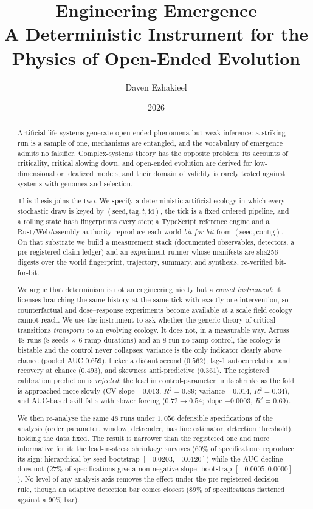 \documentclass[11pt,a4paper]{article}
\title{\textbf{Engineering Emergence}\\[2mm]
\large A Deterministic Instrument for the Physics of Open-Ended Evolution}
\author{Daven Ezhakieel}
\date{2026}
\begin{document}
\maketitle

\begin{abstract}
\noindent
Artificial-life systems generate open-ended phenomena but weak inference: a
striking run is a sample of one, mechanisms are entangled, and the vocabulary of
emergence admits no falsifier. Complex-systems theory has the opposite problem:
its accounts of criticality, critical slowing down, and open-ended evolution are
derived for low-dimensional or idealized models, and their domain of validity is
rarely tested against systems with genomes and selection.

This thesis joins the two. We specify a deterministic artificial ecology in
which every stochastic draw is keyed by $(\text{seed}, \text{tag}, t, \text{id})$,
the tick is a fixed ordered pipeline, and a rolling state hash fingerprints every
step; a TypeScript reference engine and a Rust/WebAssembly authority reproduce
each world \emph{bit-for-bit} from $(\text{seed}, \text{config})$. On that
substrate we build a measurement stack (documented observables, detectors, a
pre-registered claim ledger) and an experiment runner whose manifests are sha256
digests over the world fingerprint, trajectory, summary, and synthesis,
re-verified bit-for-bit.

We argue that determinism is not an engineering nicety but a \emph{causal
instrument}: it licenses branching the same history at the same tick with
exactly one intervention, so counterfactual and dose--response experiments
become available at a scale field ecology cannot reach. We use the instrument to
ask whether the generic theory of critical transitions \emph{transports} to an
evolving ecology. It does not, in a measurable way. Across 48 runs (8 seeds
$\times$ 6 ramp durations) and an 8-run no-ramp control, the ecology is
bistable and the control never collapses; variance is the only indicator
clearly above chance (pooled AUC $0.659$), flicker a distant second ($0.562$),
lag-1 autocorrelation and recovery at chance ($0.493$), and skewness
anti-predictive ($0.361$). The registered calibration prediction is
\emph{rejected}: the lead in control-parameter units shrinks as the fold is
approached more slowly (CV slope $-0.013$, $R^2 = 0.89$; variance $-0.014$,
$R^2 = 0.34$), and AUC-based skill falls with slower forcing
($0.72 \to 0.54$; slope $-0.0003$, $R^2 = 0.69$).

We then re-analyse the same 48 runs under $1{,}056$ defensible specifications of
the analysis (order parameter, window, detrender, baseline estimator, detection
threshold), holding the data fixed. The result is narrower than the registered
one and more informative for it: the lead-in-stress shrinkage survives (60\% of
specifications reproduce its sign; hierarchical-by-seed bootstrap
$[-0.0203, -0.0120]$) while the AUC decline does not (27\% of specifications
give a non-negative slope; bootstrap $[-0.0005, 0.0000]$). No level of any
analysis axis removes the effect under the pre-registered decision rule, though
an adaptive detection bar comes closest (89\% of specifications flattened
against a 90\% bar).


\end{abstract}
\end{document}
